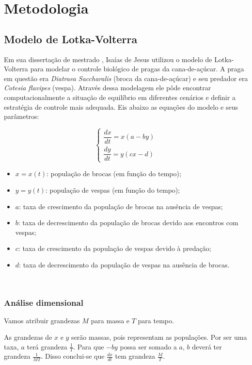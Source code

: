 \section{Metodologia}

\subsection{Modelo de Lotka-Volterra}

Em sua dissertação de mestrado \cite{ij_2018}, Isaías de Jesus utilizou o modelo de Lotka-Volterra para modelar o controle biológico de pragas da cana-de-açúcar. A praga em questão era \textit{Diatraea Saccharalis} (broca da cana-de-açúcar) e seu predador era \textit{Cotesia flavipes} (vespa). Através dessa modelagem ele pôde encontrar computacionalmente a situação de equilíbrio em diferentes cenários e definir a estratégia de controle mais adequada. Eis abaixo as equações do modelo e seus parâmetros:

$$\left\{
\begin{array}{l}
\dfrac{dx}{dt}=x(a-by)\\
\dfrac{dy}{dt}=y(cx-d)
\end{array}
\right.$$

\begin{itemize}
    \item $x=x(t)$: população de brocas (em função do tempo); 
    \item $y=y(t)$: população de vespas (em função do tempo);
    \item $a$: taxa de crescimento da população de brocas na ausência de vespas;
    \item $b$: taxa de decrescimento da população de brocas devido aos encontros com vespas;
    \item $c$: taxa de crescimento da população de vespas devido à predação;
    \item $d$: taxa de decrescimento da população de vespas na ausência de brocas.
\end{itemize}

\

\subsubsection{Análise dimensional}

Vamos atribuir grandezas $M$ para massa e $T$ para tempo.

As grandezas de $x$ e $y$ serão massas, pois representam as populações. Por ser uma taxa, $a$ terá grandeza $\frac{1}{T}$. Para que $-by$ possa ser somado a $a$, $b$ deverá ter grandeza $\frac{1}{MT}$. Disso conclui-se que $\frac{dx}{dt}$ tem grandeza $\frac{M}{T}$.

